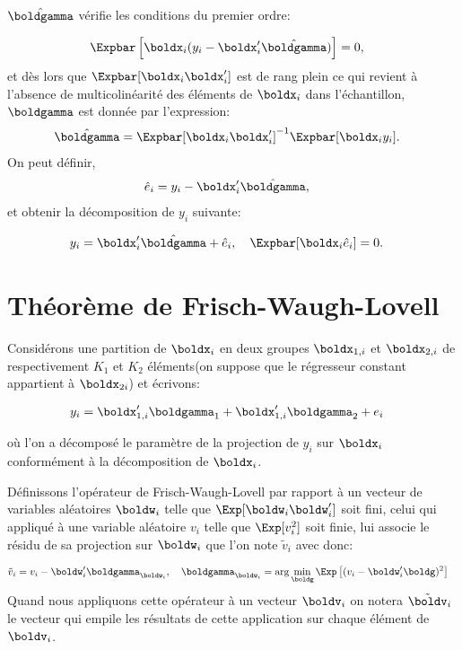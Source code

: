 $\hat{\boldgamma}$ vérifie les conditions du premier ordre:


\begin{align*}
	\Expbar\left[\boldx_i(y_i - \boldx_i^\prime\hat{\boldgamma})\right] &=0,
	\end{align*}
	et dès lors que $\Expbar[\boldx_i\boldx_i^\prime]$ est de rang plein ce qui revient 
	à l'absence de multicolinéarité des éléments de $\boldx_i$ dans l'échantillon, $\boldgamma$ est donnée par l'expression: 
	\begin{align*}
		\hat{\boldgamma} &= \Expbar[\boldx_i \boldx_i^\prime]^{-1}\Expbar[\boldx_iy_i].
	\end{align*}
	On peut définir,
	\begin{align*} 
	\hat{e}_i &= y_i - \boldx_i^\prime\hat{\boldgamma},
	\end{align*}
	et obtenir la décomposition de $y_i$ suivante:
	
	\begin{align*} 
	y_i &= \boldx_i^\prime\hat{\boldgamma} + \hat{e}_i, \quad \Expbar[\boldx_i \hat{e}_i] = 0.
\end{align*}

\section{Théorème de Frisch-Waugh-Lovell}

Considérons une partition de $\boldx_i$ en deux groupes $\boldx_{1, i}$ et $\boldx_{2,i}$ de respectivement $K_1$ et $K_2$ 
éléments(on suppose que le régresseur constant appartient à  $\boldx_{2i}$) et écrivons:

\begin{align}
y_i &= \boldx_{1, i}^\prime \boldgamma_1 + \boldx_{1, i}^\prime \boldgamma_2 + e_i
\label{eq1}
\end{align}

où l'on a décomposé le paramètre de la projection de $y_i$ sur $\boldx_i$ 
conformément à la décomposition de $\boldx_i$.

Définissons l'opérateur de Frisch-Waugh-Lovell par rapport à un vecteur de variables aléatoires $\boldw_i$ telle que $\Exp[\boldw_i\boldw_i^\prime]
$ soit fini, celui qui appliqué à une variable aléatoire $v_i$ telle que $\Exp[v_i^2]$ soit finie, lui associe le résidu de sa projection sur $\boldw_i$ 
que l'on note $\tilde{v}_i$ avec donc:

\begin{align*}
\tilde{v}_i &= v_i -\boldw_i^\prime\boldgamma_{\boldw_i}, \quad
\boldgamma_{\boldw_i} = \arg\min_{\boldg}\Exp\left[(v_i - \boldw_i^\prime \boldg)^2\right]
\end{align*}
Quand nous appliquons cette opérateur à un vecteur $\boldv_i$ on notera $\tilde{\boldv}_i$ 
le vecteur qui empile les résultats de cette application sur chaque élément de  $\boldv_i$.

